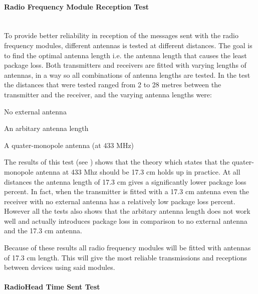 \paragraph{Radio Frequency Module Reception Test} %
\label{par:radio_frequency_module_reception_test}\hfill\\
To provide better reliability in reception of the messages sent with the radio frequency modules, different antennas is tested at different distances.
The goal is to find the optimal antenna length i.e. the antenna length that causes the least package loss.
Both transmitters and receivers are fitted with varying lengths of antennas, in a way so all combinations of antenna lengths are tested. 
In the test the distances that were tested ranged from 2 to 28 metres between the transmitter and the receiver, and the varying antenna lengths were:
\begin{description}[labelindent=\parindent]
    \item[0 cm] No external antenna
    \item[12 cm] An arbitary antenna length
    \item[17.3 cm] A quater-monopole antenna (at 433 MHz)
\end{description} 
\noindent
The results of this test (see ) shows that the theory which states that the quater-monopole antenna at 433 Mhz should be 17.3 cm holds up in practice.
At all distances the antenna length of 17.3 cm gives a significantly lower package loss percent.
In fact, when the transmitter is fitted with a 17.3 cm antenna even the receiver with no external antenna has a relatively low package loss percent.
However all the tests also shows that the arbitary antenna length does not work well and actually introduces package loss in comparison to no external antenna and the 17.3 cm antenna.

Because of these results all radio frequency modules will be fitted with antennas of 17.3 cm length.
This will give the most reliable transmissions and receptions between devices using said modules.

\paragraph{RadioHead Time Sent Test} %
\label{par:radiohead_time_sent_test}


